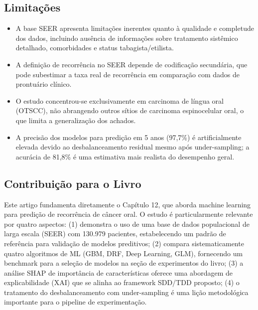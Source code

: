 \subsection{Limitações}
\begin{itemize}
  \item A base SEER apresenta limitações inerentes quanto à qualidade
        e completude dos dados, incluindo ausência de informações sobre
        tratamento sistêmico detalhado, comorbidades e status
        tabagista/etilista.
  \item A definição de recorrência no SEER depende de codificação
        secundária, que pode subestimar a taxa real de recorrência
        em comparação com dados de prontuário clínico.
  \item O estudo concentrou-se exclusivamente em carcinoma de língua
        oral (OTSCC), não abrangendo outros sítios de carcinoma
        espinocelular oral, o que limita a generalização dos achados.
  \item A precisão dos modelos para predição em 5 anos (97,7\%) é
        artificialmente elevada devido ao desbalanceamento residual
        mesmo após under-sampling; a acurácia de 81,8\% é uma
        estimativa mais realista do desempenho geral.
\end{itemize}

\subsection{Contribuição para o Livro}
Este artigo fundamenta diretamente o Capítulo 12, que aborda machine learning
para predição de recorrência de câncer oral. O estudo é particularmente
relevante por quatro aspectos: (1) demonstra o uso de uma base de dados
populacional de larga escala (SEER) com 130.979 pacientes, estabelecendo
um padrão de referência para validação de modelos preditivos; (2) compara
sistematicamente quatro algoritmos de ML (GBM, DRF, Deep Learning, GLM),
fornecendo um benchmark para a seleção de modelos na seção de experimentos
do livro; (3) a análise SHAP de importância de características oferece uma
abordagem de explicabilidade (XAI) que se alinha ao framework SDD/TDD
proposto; (4) o tratamento do desbalanceamento com under-sampling é uma
lição metodológica importante para o pipeline de experimentação.

